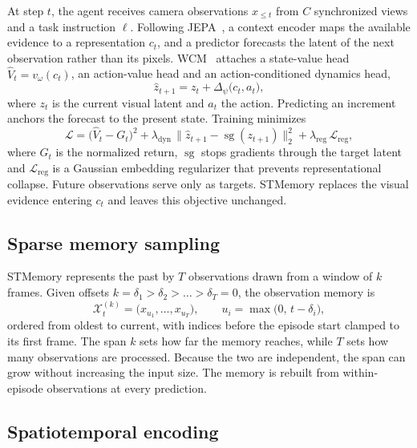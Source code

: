 \documentclass[10pt,a4paper]{article}
\begin{document}
At step $t$, the agent receives camera observations $x_{\le t}$ from $C$ synchronized views and a task instruction $\ell$. Following JEPA~\citep{assran2023ijepa,bardes2024vjepa}, a context encoder maps the available evidence to a representation $c_t$, and a predictor forecasts the latent of the next observation rather than its pixels. WCM~\citep{fei2026wcm} attaches a state-value head $\hat V_t=v_\omega(c_t)$, an action-value head and an action-conditioned dynamics head,
\begin{equation}
\hat z_{t+1}=z_t+\Delta_\psi\bigl(c_t,a_t\bigr),
\label{eq:dyn}
\end{equation}
where $z_t$ is the current visual latent and $a_t$ the action. Predicting an increment anchors the forecast to the present state. Training minimizes
\begin{equation}
\mathcal L=\bigl(\hat V_t-G_t\bigr)^2+\lambda_{\mathrm{dyn}}\,\bigl\|\hat z_{t+1}-\operatorname{sg}(z_{t+1})\bigr\|_2^2+\lambda_{\mathrm{reg}}\,\mathcal L_{\mathrm{reg}},
\label{eq:loss}
\end{equation}
where $G_t$ is the normalized return, $\operatorname{sg}$ stops gradients through the target latent and $\mathcal L_{\mathrm{reg}}$ is a Gaussian embedding regularizer that prevents representational collapse. Future observations serve only as targets. STMemory replaces the visual evidence entering $c_t$ and leaves this objective unchanged.

\subsection{Sparse memory sampling}

STMemory represents the past by $T$ observations drawn from a window of $k$ frames. Given offsets $k=\delta_1>\delta_2>\dots>\delta_T=0$, the observation memory is
\begin{equation}
\mathcal X_t^{(k)}=\bigl(x_{u_1},\dots,x_{u_T}\bigr),\qquad u_i=\max\bigl(0,\,t-\delta_i\bigr),
\label{eq:sample}
\end{equation}
ordered from oldest to current, with indices before the episode start clamped to its first frame. The span $k$ sets how far the memory reaches, while $T$ sets how many observations are processed. Because the two are independent, the span can grow without increasing the input size. The memory is rebuilt from within-episode observations at every prediction.

\subsection{Spatiotemporal encoding}
\end{document}
